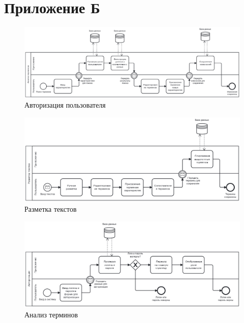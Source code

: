 \section*{Приложение Б}

\begin{figure}
	\centering
	\includegraphics[width=\textwidth ]{img/BPMN/1.png}
	\caption{Авторизация пользователя}
	\label{fig:bpmn1}
\end{figure} 

\begin{figure}
	\centering
	\includegraphics[width=\textwidth ]{img/BPMN/2.png}
	\caption{Разметка текстов}
	\label{fig:bpmn2}
\end{figure} 

\begin{figure}
	\centering
	\includegraphics[width=\textwidth ]{img/BPMN/3.png}
	\caption{Анализ терминов}
	\label{fig:bpmn3}
\end{figure} 

\pagebreak